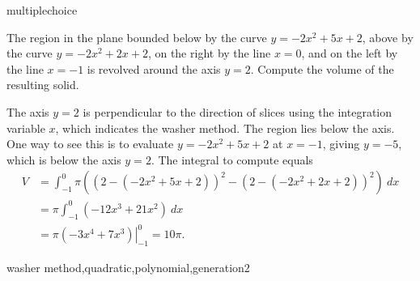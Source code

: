 \documentclass{ximera}
\begin{document}
\begin{question}[WasherQuad008]
\begin{type}
multiplechoice
\end{type}
The region in the plane bounded below by the curve \(y=-2x^2+5x+2\), above by the curve \(y=-2x^2+2x+2\), on the right by the line  \(x = 0\), and on the left by the line \(x = -1\) is revolved around the axis \(y = 2\). Compute the volume of the resulting solid.
\begin{multiplechoice}
\choice[correct]{\(10\pi\)}
\choice{\(14\pi\)}
\choice{\(18\pi\)}
\choice{\(22\pi\)}
\choice{\(26\pi\)}
\choice{\(30\pi\)}
\end{multiplechoice}
\begin{feedback}
The axis \(y = 2\) is perpendicular to the direction of slices using the integration variable \(x\), which indicates the washer method. 
 The region lies below the axis. One way to see this is to evaluate \(y=-2x^2+5x+2\) at \(x = -1\), giving \(y = -5\), which is below the axis \(y = 2\).
The integral to compute equals \[ \begin{aligned} V &= \int_{-1}^{0}\pi \left((2-(-2x^2+5x+2))^2 - (2-(-2x^2+2x+2))^2\right)~ dx\\
& = \pi \int_{-1}^{0} (-12x^3+21x^2)~ dx\\
& = \pi \left. \left(-3x^4+7x^3\right) \right|_{-1}^{0} = 10\pi. \end{aligned}\]
\end{feedback}
\begin{keywords}
washer method,quadratic,polynomial,generation2
\end{keywords}
\end{question}
\end{document}
